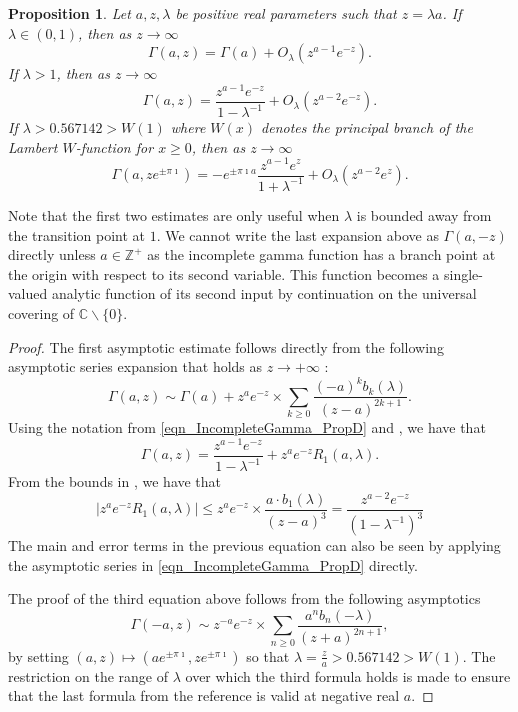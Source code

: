 \documentclass[11pt,reqno,a4letter]{article}
\numberwithin{equation}{section}
\numberwithin{figure}{section}
\numberwithin{table}{section}
\theoremstyle{plain}
\newtheorem{prop}[theorem]{Proposition}
\numberwithin{theorem}{section}
\theoremstyle{definition}
\begin{document}
\begin{prop}
\label{prop_IncGammaLambdaTypeBounds_v1}
Let $a,z,\lambda$ be positive real parameters such that $z=\lambda a$. 
If $\lambda \in (0, 1)$, then as $z \rightarrow \infty$ 
\[
\Gamma(a, z) = \Gamma(a) + O_{\lambda}\left(z^{a-1} e^{-z}\right). 
\]
If $\lambda > 1$, then as 
$z \rightarrow \infty$ 
\[
\Gamma(a, z) = \frac{z^{a-1} e^{-z}}{1-\lambda^{-1}} + O_{\lambda}\left(z^{a-2} e^{-z}\right). 
\]
If $\lambda > 0.567142 > W(1)$ where $W(x)$ denotes the principal branch of the 
Lambert $W$-function for $x \geq 0$, 
then as $z \rightarrow \infty$ 
\[
\Gamma(a, z e^{\pm\pi\imath}) = -e^{\pm \pi\imath a} \frac{z^{a-1} e^{z}}{1 + \lambda^{-1}} + 
     O_{\lambda}\left(z^{a-2} e^{z}\right). 
\]
\end{prop}
Note that the first two estimates are only useful when $\lambda$ is bounded away from the 
transition point at $1$. 
We cannot write the last expansion above 
as $\Gamma(a, -z)$ directly unless $a \in \mathbb{Z}^{+}$ 
as the incomplete gamma function 
has a branch point at the origin with respect to its second variable. 
This function becomes a single-valued 
analytic function of its second input by continuation 
on the universal covering of $\mathbb{C} \mathbin{\backslash} \{0\}$. 
\begin{proof}
The first asymptotic estimate follows directly from the following 
asymptotic series expansion that holds as $z \rightarrow +\infty$ 
\cite[Eq.\ (2.1)]{NEMES2019}: 
\[
\Gamma(a, z) \sim \Gamma(a) + z^a e^{-z} \times \sum_{k \geq 0} 
     \frac{(-a)^k b_k(\lambda)}{(z-a)^{2k+1}}. 
\]
Using the notation from \eqref{eqn_IncompleteGamma_PropD} and \cite{NEMES2016}, 
we have that 
\[
\Gamma(a, z) = \frac{z^{a-1} e^{-z}}{1-\lambda^{-1}} + z^{a} e^{-z} R_1(a, \lambda). 
\]
From the bounds in \cite[\S 3.1]{NEMES2016}, we have that 
\[
\left\lvert z^{a} e^{-z} R_1(a, \lambda) \right\rvert \leq 
     z^a e^{-z} \times \frac{a \cdot b_1(\lambda)}{(z-a)^{3}} = 
     \frac{z^{a-2} e^{-z}}{(1-\lambda^{-1})^{3}}
\]
The main and error terms in the previous equation can also be 
seen by applying the asymptotic series in 
\eqref{eqn_IncompleteGamma_PropD} directly. 

The proof of the third equation above follows from the following asymptotics 
\cite[Eq.\ (1.1)]{NEMES2015C}
\[
\Gamma(-a, z) \sim z^{-a} e^{-z} \times \sum_{n \geq 0} \frac{a^n b_n(-\lambda)}{(z+a)^{2n+1}}, 
\]
by setting $(a, z) \mapsto \left(a e^{\pm \pi\imath}, z e^{\pm \pi\imath}\right)$ so that 
$\lambda = \frac{z}{a} > 0.567142 > W(1)$. 
The restriction on the range of $\lambda$ over which the third formula holds is made to ensure that 
the last formula from the reference is valid at negative real $a$. 
\end{proof}
\end{document}
